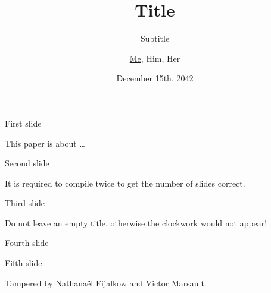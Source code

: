 \documentclass[svgnames]{beamer}
\begin{document}
\addtocounter{framenumber}{-1}

\title{Title}
\subtitle{Subtitle}
\author{\underline{Me}, Him, Her}
\date{December 15th, 2042}

\begin{frame}
\maketitle
\end{frame}

\begin{frame}{First slide}

This paper is about \ldots

\end{frame}

\begin{frame}{Second slide}

It is required to compile twice to get the number of slides correct.

\end{frame}

\begin{frame}{Third slide}

Do not leave an empty title, otherwise the clockwork would not appear!

\end{frame}

\begin{frame}{Fourth slide}


\end{frame}

\begin{frame}{Fifth slide}

Tampered by Nathana\"el Fijalkow and Victor Marsault.

\end{frame}
\end{document}
